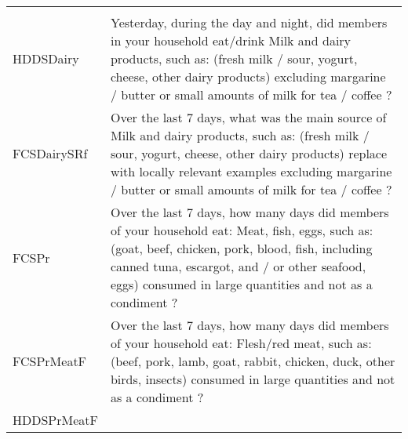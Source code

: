 \documentclass[
]{article}
\begin{document}
\begin{longtable}[]{@{}ll@{}}
\begin{minipage}[t]{0.72\columnwidth}
\end{minipage}\tabularnewline
\begin{minipage}[t]{0.22\columnwidth}\raggedright
HDDSDairy\strut
\end{minipage} & \begin{minipage}[t]{0.72\columnwidth}\raggedright
Yesterday, during the day and night, did members in your household eat/drink Milk and dairy products, such as: (fresh milk / sour, yogurt, cheese, other dairy products) excluding margarine / butter or small amounts of milk for tea / coffee ?\strut
\end{minipage}\tabularnewline
\begin{minipage}[t]{0.22\columnwidth}\raggedright
FCSDairySRf\strut
\end{minipage} & \begin{minipage}[t]{0.72\columnwidth}\raggedright
Over the last 7 days, what was the main source of Milk and dairy products, such as: (fresh milk / sour, yogurt, cheese, other dairy products) replace with locally relevant examples excluding margarine / butter or small amounts of milk for tea / coffee ?\strut
\end{minipage}\tabularnewline
\begin{minipage}[t]{0.22\columnwidth}\raggedright
FCSPr\strut
\end{minipage} & \begin{minipage}[t]{0.72\columnwidth}\raggedright
Over the last 7 days, how many days did members of your household eat: Meat, fish, eggs, such as: (goat, beef, chicken, pork, blood, fish, including canned tuna, escargot, and / or other seafood, eggs) consumed in large quantities and not as a condiment ?\strut
\end{minipage}\tabularnewline
\begin{minipage}[t]{0.22\columnwidth}\raggedright
FCSPrMeatF\strut
\end{minipage} & \begin{minipage}[t]{0.72\columnwidth}\raggedright
Over the last 7 days, how many days did members of your household eat: Flesh/red meat, such as: (beef, pork, lamb, goat, rabbit, chicken, duck, other birds, insects) consumed in large quantities and not as a condiment ?\strut
\end{minipage}\tabularnewline
\begin{minipage}[t]{0.22\columnwidth}\raggedright
HDDSPrMeatF\strut
\end{minipage} & \begin{minipage}[t]{0.72\columnwidth}\raggedright

\end{minipage}
\end{longtable}
\end{document}
